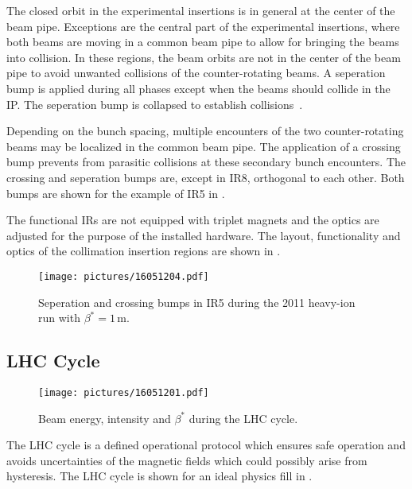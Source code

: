 The closed orbit in the experimental insertions is in general at the center of the beam pipe. Exceptions are the central part of the experimental insertions, where both beams are moving in a common beam pipe to allow for bringing the beams into collision. In these regions, the beam orbits are not in the center of the beam pipe to avoid unwanted collisions of the counter-rotating beams. A seperation bump is applied during all phases except when the beams should collide in the IP. The seperation bump is collapsed to establish collisions~\citedr. 

Depending on the bunch spacing, multiple encounters of the two counter-rotating beams may be localized in the common beam pipe. The application of a crossing bump prevents from parasitic collisions at these secondary bunch encounters. The crossing and seperation bumps are, except in IR8, orthogonal to each other. Both bumps are shown for the example of IR5 in .

The functional IRs are not equipped with triplet magnets and the optics are adjusted for the purpose of the installed hardware. The layout, functionality and optics of the collimation insertion regions are shown in . 
%
%
%
\begin{figure}[htbp]  
    \centering
    \texttt{[image: pictures/16051204.pdf]}
    \caption{Seperation and crossing bumps in IR5 during the 2011 heavy-ion run with $\beta^*=1\,$m.}  
    \label{pic:16051204}
\end{figure}
%
%


\subsection{LHC Cycle} \label{chap:lhccycle}
% 
\begin{figure}[b]  
    \centering
    \texttt{[image: pictures/16051201.pdf]}
    \caption{Beam energy, intensity and $\beta^*$ during the LHC cycle.}  
    \label{pic:16040801}
\end{figure}
%

The LHC cycle is a defined operational protocol which ensures safe operation and avoids uncertainties of the magnetic fields which could possibly arise from hysteresis. The LHC cycle is shown for an ideal physics fill in . 

